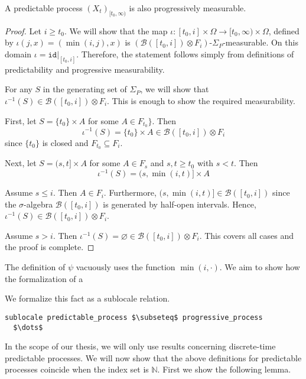 \begin{lemma}
	A predictable process $(X_t)_{[t_0,\infty)}$ is also progressively measurable.
\end{lemma}
\begin{proof}
	Let $i \ge t_0$. We will show that the map $\iota : [t_0, i] \times \Omega \rightarrow [t_0,\infty) \times \Omega$, defined by $\iota(j,x) = (\min(i, j),x)$ is $(\mathcal{B}([t_0,i]) \otimes F_i)$-$\Sigma_P$-measurable. On this domain $\iota = \texttt{id}\vert_{[t_0, i]}$. Therefore, the statement follows simply from definitions of predictability and progressive measurability.
	
	For any $S$ in the generating set of $\Sigma_P$, we will show that $\iota^{-1}(S) \in \mathcal{B}([t_0,i]) \otimes F_i$. This is enough to show the required measurability.
	
	First, let $S = \{t_0\} \times A$ for some $A \in F_{t_0}\}$.
	Then
	\[
		\iota^{-1}(S) = \{t_0\} \times A \in \mathcal{B}([t_0,i]) \otimes F_i
	\]
	since $\{t_0\}$ is closed and $F_{t_0} \subseteq F_i$.
	
	Next, let $S = (s,t] \times A$ for some $A \in F_s$ and $s, t \ge t_0$ with $s < t$.
	Then
	\[
		\iota^{-1}(S) = (s, \min(i, t)] \times A
	\]
	
	Assume $s \le i$. Then $A \in F_i$. Furthermore, $(s, \min(i, t)] \in \mathcal{B}([t_0,i])$ since the $\sigma$-algebra $\mathcal{B}([t_0,i])$ is generated by half-open intervals. 
	Hence, $\iota^{-1}(S) \in \mathcal{B}([t_0,i]) \otimes F_i$.
	
	Assume $s > i$. Then $\iota^{-1}(S) = \varnothing \in \mathcal{B}([t_0,i]) \otimes F_i$. This covers all cases and the proof is complete.
\end{proof}

\begin{remark}
	The definition of $\psi$ vacuously uses the function $\min(i,\cdot)$. We aim to show how the formalization of a
\end{remark}

We formalize this fact as a sublocale relation.

\begin{isalemma}
{\small
\begin{lstlisting}[style=isabelle]
sublocale predictable_process $\subseteq$ progressive_process
  $\dots$
\end{lstlisting}
}
\end{isalemma}

In the scope of our thesis, we will only use results concerning discrete-time predictable processes. We will now show that the above definitions for predictable processes coincide when the index set is $\mathbb{N}$. First we show the following lemma.

